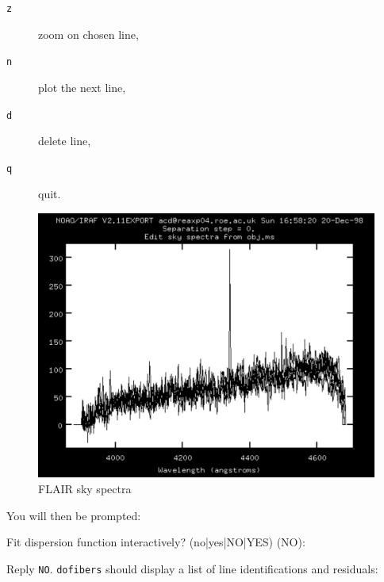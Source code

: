 \documentclass[chapters,twoside,11pt]{starlink}
\begin{document}
\begin{enumerate}
  \begin{description}

    \item[\texttt{z}] zoom on chosen line,

    \item[\texttt{n}] plot the next line,

    \item[\texttt{d}] delete line,

    \item[\texttt{q}] quit.

  \end{description}

  \begin{figure}[htbp]
     \centering
     \includegraphics[totalheight=4in]{sc14_flair_sky}
     \caption{FLAIR sky spectra
     \label{FLAIR_SKY} }
  \end{figure}

   You will then be prompted:

\begin{terminalv}
Fit dispersion function interactively? (no|yes|NO|YES) (NO):
\end{terminalv}

   Reply \texttt{NO}.  \texttt{dofibers} should display a list of line
   identifications and residuals:


\end{enumerate}
\end{document}
